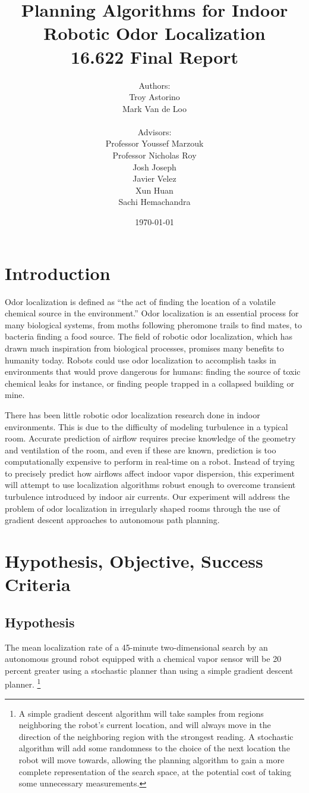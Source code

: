 \documentclass[submit]{aiaa-pretty-modified}
\title{\textbf{Planning Algorithms for Indoor Robotic Odor Localization}
\\  16.622 Final Report}
\date{\today}
\author{Authors: \\Troy Astorino \\ Mark Van de Loo \\
  \\ 
  Advisors:\\ Professor Youssef Marzouk \\ Professor Nicholas
    Roy \\ Josh Joseph \\ Javier Velez \\ Xun Huan \\ Sachi Hemachandra}
\begin{document}
\maketitle

\newpage

\tableofcontents

\newpage

\section{Introduction}

Odor localization is defined as ``the act of finding the location of a
volatile chemical source in the environment.''\cite{kowadlo} Odor
localization is an essential process for many biological systems, from
moths following pheromone trails to find mates, to bacteria finding a
food source. The field of robotic odor localization, which has drawn
much inspiration from biological processes, promises many benefits to
humanity today. Robots could use odor localization to accomplish tasks
in environments that would prove dangerous for humans: finding the
source of toxic chemical leaks for instance, or finding people
trapped in a collapsed building or mine.

There has been little robotic odor localization research done in indoor
environments. This is due to the difficulty of modeling turbulence in a typical
room. Accurate prediction of airflow requires precise knowledge of the geometry
and ventilation of the room, and even if these are known, prediction is too
computationally expensive to perform in real-time on a robot. Instead of trying
to precisely predict how airflows affect indoor vapor dispersion, this
experiment will attempt to use localization algorithms robust enough to overcome
transient turbulence introduced by indoor air currents. Our experiment will
address the problem of odor localization in irregularly shaped rooms through the
use of gradient descent approaches to autonomous path planning.

\section{Hypothesis, Objective, Success Criteria}
\label{sec:hos}
\subsection*{Hypothesis} 
The mean localization rate of a 45-minute two-dimensional search by an
autonomous ground robot equipped with a chemical vapor sensor will be
20 percent greater using a stochastic planner than using a simple gradient descent planner.
\footnote{
  A simple gradient descent algorithm will
  take samples from regions neighboring the robot’s current location, 
  and will always move in the direction of the neighboring region with
  the strongest reading. A stochastic algorithm will add some randomness
  to the choice of the next location the robot will move towards,
  allowing the planning algorithm to gain a more complete representation
  of the search space, at the potential cost of taking some unnecessary
  measurements.}
\end{document}

